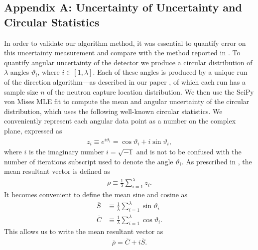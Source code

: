 \documentclass[tightenlines,
twocolumn,prl,notitlepage,nofootinbib,preprintnumbers,longbibliography]{revtex4-1}
\begin{document}
\subsection{Appendix A: Uncertainty of Uncertainty and Circular Statistics}\label{app:uncert_of_uncert_and_circularstats}
%
In order to validate our algorithm method, it was essential to quantify error on this uncertainty measurement and compare with the method reported in \cite{Duvall_2022}. To quantify angular uncertainty of the detector we produce a circular distribution of $\lambda$ angles  $\vartheta_i$, where $i\in[1,\lambda]$. Each of these angles is produced by a unique run of the direction algorithm---as described in our paper \cite{10.1063/5.0315079}, of which each run has a sample size $n$ of the neutron capture location distribution. We then use the SciPy von Mises MLE fit to compute the mean and angular uncertainty of the circular distribution, which uses the following well-known circular statistics. We conveniently represent each angular data point as a number on the complex plane, expressed as
%
\begin{align}\label{eq:zdef}
z_i\equiv e^{i\vartheta_i}=\cos\vartheta_i+i\sin\vartheta_i,
\end{align}
%
where $i$ is the imaginary number $i=\sqrt{-1}$ and is not to be confused with the number of iterations subscript  used to denote the angle $\vartheta_i$.
As prescribed in \cite{Fisher_1993}, the mean resultant vector is defined as
%
\begin{align}
\bar \rho\equiv\frac{1}{\lambda}\sum_{i=1}^\lambda z_i.
\end{align}
%
It becomes convenient to define the mean sine and cosine as
%
\begin{subequations}
\begin{align}
\overline S &\equiv \frac{1}{\lambda}\sum_{i=1}^\lambda \sin\vartheta_i
\\
\overline{C} &\equiv \frac{1}{\lambda}\sum_{i=1}^\lambda \cos\vartheta_i.
\end{align}
\end{subequations}
%
This allows us to write the mean resultant vector as
%
\begin{align}
\overline \rho = \overline C + i\overline S.
\end{align}
\end{document}
